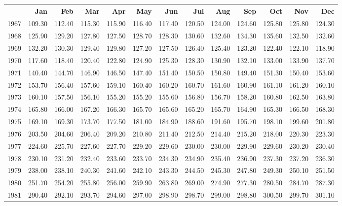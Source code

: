 \begin{longtable}{rrrrrrrrrrrrr}
  \hline
 & Jan & Feb & Mar & Apr & May & Jun & Jul & Aug & Sep & Oct & Nov & Dec \\ 
  \hline
1967 & 109.30 & 112.40 & 115.30 & 115.90 & 116.40 & 117.40 & 120.50 & 124.00 & 124.60 & 125.80 & 125.80 & 124.30 \\ 
  1968 & 125.90 & 129.20 & 127.80 & 127.50 & 128.70 & 128.30 & 130.60 & 132.60 & 134.30 & 135.60 & 132.50 & 132.60 \\ 
  1969 & 132.20 & 130.30 & 129.40 & 129.80 & 127.20 & 127.50 & 126.40 & 125.40 & 123.20 & 122.40 & 122.10 & 118.90 \\ 
  1970 & 117.60 & 118.40 & 120.40 & 122.80 & 124.90 & 125.30 & 128.30 & 130.90 & 132.10 & 133.00 & 133.90 & 137.70 \\ 
  1971 & 140.40 & 144.70 & 146.90 & 146.50 & 147.40 & 151.40 & 150.50 & 150.80 & 149.40 & 151.30 & 150.40 & 153.60 \\ 
  1972 & 153.70 & 156.40 & 157.60 & 159.10 & 160.40 & 160.20 & 160.70 & 161.60 & 160.90 & 161.10 & 161.20 & 160.10 \\ 
  1973 & 160.10 & 157.50 & 156.10 & 155.20 & 155.20 & 155.60 & 156.80 & 156.70 & 158.20 & 160.80 & 162.50 & 163.80 \\ 
  1974 & 165.80 & 166.00 & 167.20 & 166.30 & 165.70 & 165.60 & 165.20 & 165.70 & 164.90 & 165.30 & 166.50 & 168.30 \\ 
  1975 & 169.10 & 169.30 & 173.70 & 177.50 & 181.00 & 184.90 & 188.60 & 191.60 & 195.70 & 198.10 & 199.60 & 201.80 \\ 
  1976 & 203.50 & 204.60 & 206.40 & 209.20 & 210.80 & 211.40 & 212.50 & 214.40 & 215.20 & 218.00 & 220.30 & 223.30 \\ 
  1977 & 224.60 & 225.70 & 227.60 & 227.70 & 229.20 & 229.60 & 230.00 & 230.00 & 229.90 & 229.60 & 230.20 & 230.40 \\ 
  1978 & 230.10 & 231.20 & 232.40 & 233.60 & 233.70 & 234.30 & 234.90 & 235.40 & 236.90 & 237.30 & 237.20 & 236.30 \\ 
  1979 & 238.00 & 238.10 & 240.30 & 241.60 & 242.10 & 243.30 & 244.50 & 245.30 & 247.80 & 249.30 & 250.10 & 251.50 \\ 
  1980 & 251.70 & 254.20 & 255.80 & 256.00 & 259.90 & 263.80 & 269.00 & 274.90 & 277.30 & 280.50 & 284.70 & 287.30 \\ 
  1981 & 290.40 & 292.10 & 293.70 & 294.60 & 297.00 & 298.90 & 298.70 & 299.00 & 298.80 & 300.50 & 299.70 & 301.10 \\ 

\end{longtable}
